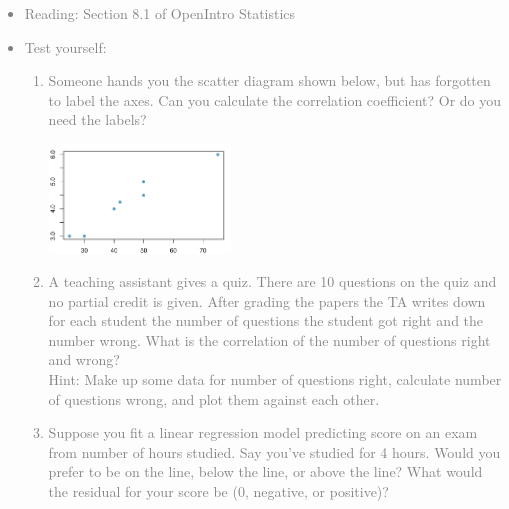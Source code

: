 \documentclass[11pt]{article}
\newcommand{\gray}[1]{\textcolor{gray}{#1}}
\begin{document}
\gray{
{\it
\vspace{-0.55cm}
\begin{itemize}
\renewcommand{\labelitemi}{{\textcolor{dark}{$\ast$}}}
\item Reading: Section 8.1 of OpenIntro Statistics
\item Test yourself:
\begin{enumerate}
\item Someone hands you the scatter diagram shown below, but has forgotten to label the axes. Can you calculate the correlation coefficient? Or do you need the labels?
\begin{center}
\includegraphics[width=0.4\textwidth]{figures/no_labels}
\end{center}
\item A teaching assistant gives a quiz. There are 10 questions on the quiz and no partial credit is given. After grading the papers the TA writes down for each student the number of questions the student got right and the number wrong. What is the correlation of the number of questions right and wrong? \\
Hint: Make up some data for number of questions right, calculate number of questions wrong, and plot them against each other.
\item Suppose you fit a linear regression model predicting score on an exam from number of hours studied. Say you've studied for 4 hours. Would you prefer to be on the line, below the line, or above the line? What would the residual for your score be (0, negative, or positive)?
\end{enumerate}
\end{itemize}
}}

%

\vspace{0.48cm}
\end{document}
